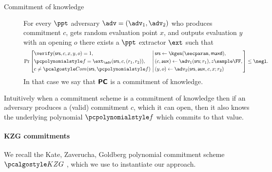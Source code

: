 \documentclass[runningheads,11pt]{llncs}
\begin{document}
\begin{description}
\item[Commitment of knowledge] For every $\ppt$ adversary
  $\adv = (\adv_1, \adv_2)$ who produces commitment $c$, gets random evaluation
  point $x$, and outputs evaluation $y$ with an opening $o$ there exists a
  $\ppt$ extractor $\ext$ such that
\[
  \Pr \left[
    \begin{aligned}
      & \verify(\srs, c, x, y, o) = 1, \\
      & \p{f} = \ext_\adv(\srs, c, (r_1, r_2)),\\
      & c \neq \com(\srs, \p{f}) \\
    \end{aligned}
    \,\left|\,
      \vphantom{
        \begin{aligned}
          & \\
          & \\
          &
        \end{aligned}
        }
    \begin{aligned}
      & \srs \gets \kgen(\secparam, \maxdeg),\\
      & (c, \aux) \gets \adv_1(\srs; r_1), z \sample \FF, \\
      &  (y, o) \gets \adv_2(\srs, \aux, c, x; r_2)
    \end{aligned}
  \right.\right]
  \leq \negl.
\]
In that case we say that $\bm{\mathsf{PC}}$ is a commitment of knowledge.
\end{description}
Intuitively when a commitment scheme is a commitment of knowledge then if an
adversary produces a (valid) commitment $c$, which it can open, then it also
knows the underlying polynomial $\p{f}$ which commits to that value.




\paragraph{KZG commitments}
We recall the Kate, Zaverucha, Goldberg polynomial commitment scheme $\Kzg$ \cite{AC:KatZavGol10}, which we use to instantiate our approach.
\end{document}
